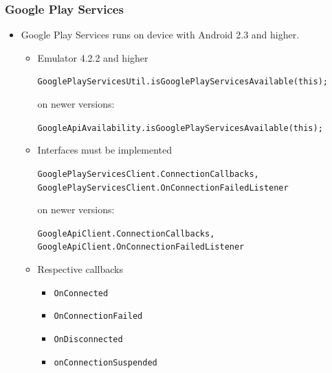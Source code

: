 \documentclass[10pt,xcolor=pdflatex]{beamer}
\begin{document}
\begin{frame}[fragile]\frametitle{Google Play Services}
\begin{itemize}
	\item Google Play Services runs on device with Android 2.3 and higher.
	  \begin{itemize}
		\item Emulator 4.2.2 and higher \newline\begin{footnotesize} \verb|GooglePlayServicesUtil.isGooglePlayServicesAvailable(this);|\end{footnotesize}\newline
		on newer versions:
		\newline\begin{footnotesize} \verb|GoogleApiAvailability.isGooglePlayServicesAvailable(this);|\end{footnotesize}
        \item Interfaces must be implemented \newline \begin{footnotesize}
\verb;GooglePlayServicesClient.ConnectionCallbacks,;
\verb;GooglePlayServicesClient.OnConnectionFailedListener;
\end{footnotesize}\newline
on newer versions:\newline \begin{footnotesize}
\verb;GoogleApiClient.ConnectionCallbacks,;
\verb;GoogleApiClient.OnConnectionFailedListener;
\end{footnotesize}
		\item Respective callbacks
		  \begin{itemize}
		    \item \texttt{OnConnected}
	        \item \texttt{OnConnectionFailed}
	        \item \texttt{OnDisconnected}
	        \item \texttt{onConnectionSuspended}
		  \end{itemize}
	  \end{itemize}
\end{itemize}
\end{frame}
\end{document}
